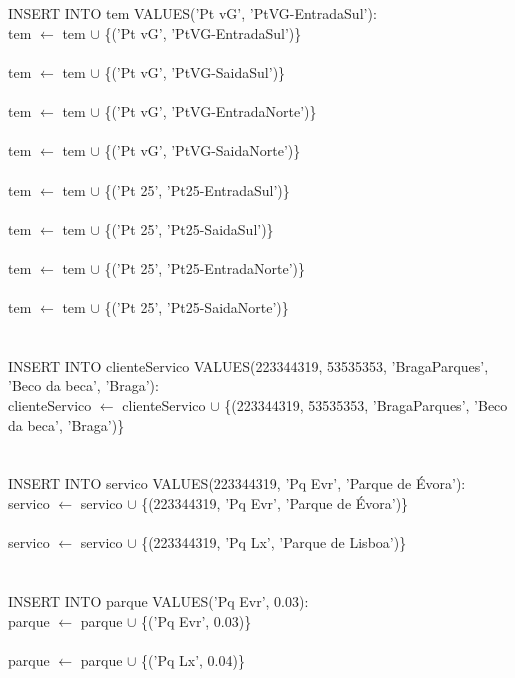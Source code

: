 \documentclass[a4paper]{article}
\begin{document}
\\
\\
INSERT INTO tem VALUES('Pt vG', 'PtVG-EntradaSul'):\\
tem $\leftarrow$ tem $\cup$ \{('Pt vG', 'PtVG-EntradaSul')\}\\
\\
tem $\leftarrow$ tem $\cup$ \{('Pt vG', 'PtVG-SaidaSul')\}\\
\\
tem $\leftarrow$ tem $\cup$ \{('Pt vG', 'PtVG-EntradaNorte')\}\\
\\
tem $\leftarrow$ tem $\cup$ \{('Pt vG', 'PtVG-SaidaNorte')\}\\
\\
tem $\leftarrow$ tem $\cup$ \{('Pt 25', 'Pt25-EntradaSul')\}\\
\\
tem $\leftarrow$ tem $\cup$ \{('Pt 25', 'Pt25-SaidaSul')\}\\
\\
tem $\leftarrow$ tem $\cup$ \{('Pt 25', 'Pt25-EntradaNorte')\}\\
\\
tem $\leftarrow$ tem $\cup$ \{('Pt 25', 'Pt25-SaidaNorte')\}\\
\\
\\
INSERT INTO clienteServico VALUES(223344319, 53535353, 'BragaParques', 'Beco da beca', 'Braga'):\\
clienteServico $\leftarrow$ clienteServico $\cup$ \{(223344319, 53535353, 'BragaParques', 'Beco da beca', 'Braga')\}\\
\\
\\
INSERT INTO servico VALUES(223344319, 'Pq Evr', 'Parque de Évora'):\\
servico $\leftarrow$ servico $\cup$ \{(223344319, 'Pq Evr', 'Parque de Évora')\}\\
\\
servico $\leftarrow$ servico $\cup$ \{(223344319, 'Pq Lx', 'Parque de Lisboa')\}\\
\\
\\
INSERT INTO parque VALUES('Pq Evr', 0.03):\\
parque $\leftarrow$ parque $\cup$ \{('Pq Evr', 0.03)\}\\
\\
parque $\leftarrow$ parque $\cup$ \{('Pq Lx', 0.04)\}\\
\\
\end{document}
